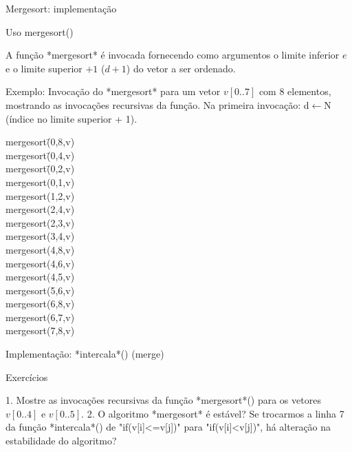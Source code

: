 \begin{frame}{Mergesort: implementação}



\end{frame}

\begin{frame}{Uso mergesort()}

\scriptsize
A função *mergesort* é invocada fornecendo como argumentos o
limite inferior $e$ e o limite superior $+1$ ($d+1$) do vetor a ser ordenado.

Exemplo: Invocação do *mergesort* para um vetor
$v[0..7]$ com $8$ elementos, mostrando as invocações recursivas da
função. Na primeira invocação: d$\leftarrow$N (índice no limite
superior + 1).

\begin{tabbing}
mergesort\=(0,8,v) \\
            \>mergesort\=(0,4,v) \\
                          \>\>mergesort\=(0,2,v) \\
                                \>\>\>mergesort(0,1,v)\\
                                \>\>\>mergesort(1,2,v)\\
                          \>\>mergesort(2,4,v)\\
                                \>\>\>mergesort(2,3,v)\\
                                \>\>\>mergesort(3,4,v)\\
             \>mergesort(4,8,v)\\
                          \>\>mergesort(4,6,v)\\
                                \>\>\>mergesort(4,5,v)\\
                                \>\>\>mergesort(5,6,v)\\
                          \>\>mergesort(6,8,v)\\
                                \>\>\>mergesort(6,7,v)\\
                                \>\>\>mergesort(7,8,v)\\
\end{tabbing}

\end{frame}

\begin{frame}{Implementação: *intercala*() (merge)}



\end{frame}

\begin{frame}{Exercícios}

1. Mostre as invocações recursivas da função *mergesort*() para os
vetores $v[0..4]$ e $v[0..5]$.  2. O algoritmo *mergesort* é estável?
Se trocarmos a linha 7 da função *intercala*() de "if(v[i]<=v[j])"
para "if(v[i]<v[j])", há alteração na estabilidade do algoritmo?

\end{frame}

